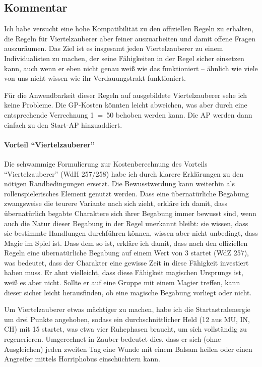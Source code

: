 \subsection{Kommentar}
Ich habe versucht eine hohe Kompatibilität zu den offiziellen Regeln zu erhalten, die Regeln für Viertelzauberer aber feiner auszuarbeiten und damit offene Fragen auszuräumen. Das Ziel ist es insgesamt jeden Viertelzauberer zu einem Individualisten zu machen, der seine Fähigkeiten in der Regel sicher einsetzen kann, auch wenn er eben nicht genau weiß wie das funktioniert -- ähnlich wie viele von uns nicht wissen wie ihr Verdauungstrakt funktioniert.

Für die Anwendbarkeit dieser Regeln auf ausgebildete Viertelzauberer sehe ich keine Probleme. Die GP-Kosten könnten leicht abweichen, was aber durch eine entsprechende Verrechnung \SI{1}{\GP}~=~\SI{50}{\AP} behoben werden kann. Die AP werden dann einfach zu den Start-AP hinzuaddiert.

\paragraph{Vorteil \enquote{Viertelzauberer}}
Die schwammige Formulierung zur Kostenberechnung des Vorteils \enquote{Viertelzauberer} (WdH 257/258) habe ich durch klarere Erklärungen zu den nötigen Randbedingungen ersetzt. Die Bewusstwerdung kann weiterhin als rollenspielerisches Element genutzt werden. Dass eine übernatürliche Begabung zwangsweise die teurere Variante nach sich zieht, erkläre ich damit, dass übernatürlich begabte Charaktere sich ihrer Begabung immer bewusst sind, wenn auch die Natur dieser Begabung in der Regel unerkannt bleibt: sie wissen, dass sie bestimmte Handlungen durchführen können, wissen aber nicht unbedingt, dass Magie im Spiel ist. Dass dem so ist, erkläre ich damit, dass nach den offiziellen Regeln eine übernatürliche Begabung auf einem Wert von 3 startet (WdZ 257), was bedeutet, dass der Charakter eine gewisse Zeit in diese Fähigkeit investiert haben muss. Er ahnt vielleicht, dass diese Fähigkeit magischen Ursprungs ist, weiß es aber nicht. Sollte er auf eine Gruppe mit einem Magier treffen, kann dieser sicher leicht herausfinden, ob eine magische Begabung vorliegt oder nicht.

Um Viertelzauberer etwas mächtiger zu machen, habe ich die Startastralenergie um drei Punkte angehoben, sodass ein durchschnittlicher Held (12 aus MU, IN, CH) mit \SI{15}{\AsP} startet, was etwa vier Ruhephasen braucht, um sich vollständig zu regenerieren. Umgerechnet in Zauber bedeutet dies, dass er sich (ohne Ausgleichen) jeden zweiten Tag eine Wunde mit einem Balsam heilen oder einen Angreifer mittels Horriphobus einschüchtern kann.

